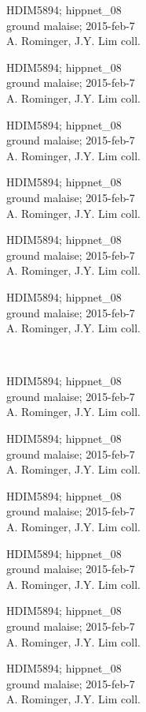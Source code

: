 \documentclass[2pt]{extarticle}
\begin{document}
\noindent
\parbox{0.16\textwidth}{\tiny \raggedright \rule[-0.3\baselineskip]{0pt}{10pt}HDIM5894; hippnet\_08\\ ground malaise; 2015-feb-7\\ A. Rominger, J.Y. Lim coll.}
\parbox{0.16\textwidth}{\tiny \raggedright \rule[-0.3\baselineskip]{0pt}{10pt}HDIM5894; hippnet\_08\\ ground malaise; 2015-feb-7\\ A. Rominger, J.Y. Lim coll.}
\parbox{0.16\textwidth}{\tiny \raggedright \rule[-0.3\baselineskip]{0pt}{10pt}HDIM5894; hippnet\_08\\ ground malaise; 2015-feb-7\\ A. Rominger, J.Y. Lim coll.}
\parbox{0.16\textwidth}{\tiny \raggedright \rule[-0.3\baselineskip]{0pt}{10pt}HDIM5894; hippnet\_08\\ ground malaise; 2015-feb-7\\ A. Rominger, J.Y. Lim coll.}
\parbox{0.16\textwidth}{\tiny \raggedright \rule[-0.3\baselineskip]{0pt}{10pt}HDIM5894; hippnet\_08\\ ground malaise; 2015-feb-7\\ A. Rominger, J.Y. Lim coll.}
\parbox{0.16\textwidth}{\tiny \raggedright \rule[-0.3\baselineskip]{0pt}{10pt}HDIM5894; hippnet\_08\\ ground malaise; 2015-feb-7\\ A. Rominger, J.Y. Lim coll.} \\ 
\vspace{0.001in} 

\noindent
\parbox{0.16\textwidth}{\tiny \raggedright \rule[-0.3\baselineskip]{0pt}{10pt}HDIM5894; hippnet\_08\\ ground malaise; 2015-feb-7\\ A. Rominger, J.Y. Lim coll.}
\parbox{0.16\textwidth}{\tiny \raggedright \rule[-0.3\baselineskip]{0pt}{10pt}HDIM5894; hippnet\_08\\ ground malaise; 2015-feb-7\\ A. Rominger, J.Y. Lim coll.}
\parbox{0.16\textwidth}{\tiny \raggedright \rule[-0.3\baselineskip]{0pt}{10pt}HDIM5894; hippnet\_08\\ ground malaise; 2015-feb-7\\ A. Rominger, J.Y. Lim coll.}
\parbox{0.16\textwidth}{\tiny \raggedright \rule[-0.3\baselineskip]{0pt}{10pt}HDIM5894; hippnet\_08\\ ground malaise; 2015-feb-7\\ A. Rominger, J.Y. Lim coll.}
\parbox{0.16\textwidth}{\tiny \raggedright \rule[-0.3\baselineskip]{0pt}{10pt}HDIM5894; hippnet\_08\\ ground malaise; 2015-feb-7\\ A. Rominger, J.Y. Lim coll.}
\parbox{0.16\textwidth}{\tiny \raggedright \rule[-0.3\baselineskip]{0pt}{10pt}HDIM5894; hippnet\_08\\ ground malaise; 2015-feb-7\\ A. Rominger, J.Y. Lim coll.} \\ 
\vspace{0.001in} 
\end{document}
